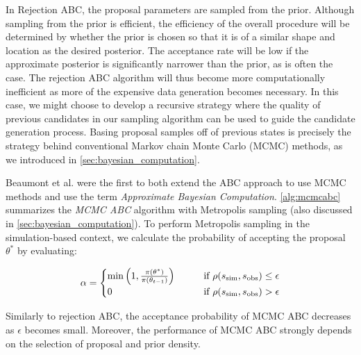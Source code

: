 In Rejection ABC, the proposal parameters are sampled from the prior. Although sampling from the prior is efficient, the efficiency of the overall procedure will be determined by whether the prior is chosen so that it is of a similar shape and location as the desired posterior. The acceptance rate will be low if the approximate posterior is significantly narrower than the prior, as is often the case. The rejection ABC algorithm will thus become more computationally inefficient as more of the expensive data generation becomes necessary. In this case, we might choose to develop a recursive strategy where the quality of previous candidates in our sampling algorithm can be used to guide the candidate generation process. Basing proposal samples off of previous states is precisely the strategy behind conventional Markov chain Monte Carlo (MCMC) methods, as we introduced in \cref{sec:bayesian_computation}. 

Beaumont et al. \cite{Beaumont} were the first to both extend the ABC approach to use MCMC methods and use the term \textit{Approximate Bayesian Computation}. \cref{alg:mcmcabc} summarizes the \textit{MCMC ABC} algorithm with Metropolis sampling (also discussed in \cref{sec:bayesian_computation}). To perform Metropolis sampling in the simulation-based context, we calculate the probability of accepting the proposal $\theta^*$ by evaluating: 

\begin{equation}\label{eq:abc_metropolis}
    \alpha = \begin{cases}
    \min \qty(1, \frac{\pi \qty(\theta^*)}{\pi \qty(\theta_{t-1})}) \qquad &\text{if } \rho \qty(s_\mathrm{sim}, s_\mathrm{obs}) \leq \epsilon 
    \\
    0 \qquad &\text{if } \rho \qty(s_\mathrm{sim}, s_\mathrm{obs}) > \epsilon 
    \end{cases}
\end{equation}

Similarly to rejection ABC, the acceptance probability of MCMC ABC decreases as $\epsilon$ becomes small. Moreover, the performance of MCMC ABC strongly depends on the selection of proposal and prior density. 

